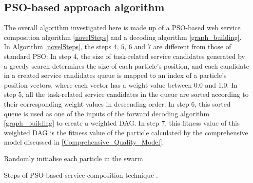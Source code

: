 \documentclass{llncs}
\begin{document}
\subsection{PSO-based approach algorithm}\label{POS-based_algomargin}
The overall algorithm investigated here is made up of a PSO-based web service composition algorithm \ref{novelSteps} and a decoding algorithm \ref{graph_building}. In Algorithm \ref{novelSteps}, the  steps $4$, $5$, $6$ and $7$ are different from those of standard PSO: In step 4, the size of task-related service candidates generated by a greedy search determines the size of each particle's position, and each candidate in a created service candidates queue is mapped to an index of a particle’s position vectors, where each vector has a weight value between 0.0 and 1.0. In step 5, all the task-related service candidates in the queue are sorted according to their corresponding weight values in descending order. In step 6, this sorted queue is used as one of the inputs of the forward decoding algorithm \ref{graph_building} to create a weighted DAG. In step 7, this fitness value of this weighted DAG is the fitness value of the particle calculated by the comprehensive model discussed in \ref{Comprehensive_Quality_Model}.
\begin{algorithm}
 \SetNlSty{}{}{:}
 Randomly initialise each particle in the swarm\;
\caption{Steps of PSO-based service composition technique \cite{da2016particle}.}
\label{novelSteps}
\end{algorithm} 
\end{document}
